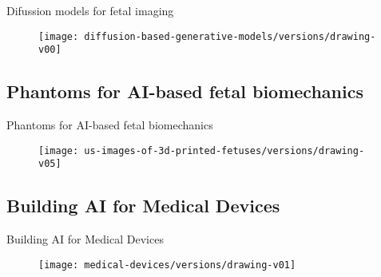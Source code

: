 {

\begin{frame}{Difussion models for fetal imaging}
      \begin{figure}
        \centering
        \texttt{[image: diffusion-based-generative-models/versions/drawing-v00]}
      \end{figure}
\end{frame}
}


\subsection{Phantoms for AI-based fetal biomechanics}

{
\begin{frame}{Phantoms for AI-based fetal biomechanics}
      \begin{figure}
        \centering
        \texttt{[image: us-images-of-3d-printed-fetuses/versions/drawing-v05]}
      \end{figure}
\end{frame}
}




\subsection{Building AI for Medical Devices}


{
\begin{frame}{Building AI for Medical Devices}

      \begin{figure}
        \centering
        \texttt{[image: medical-devices/versions/drawing-v01]}
      \end{figure}


\end{frame}
}



